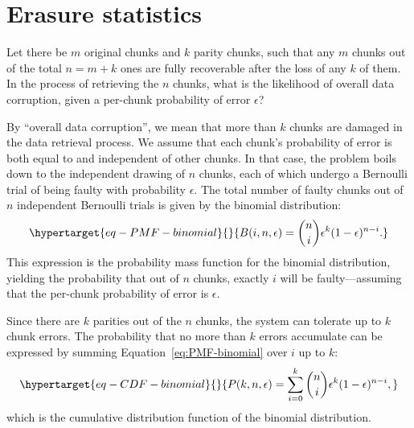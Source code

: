
% 
\chapter{Erasure statistics}
\label{sec:appendix-erasure}


Let there be \(m\) original chunks and \(k\) parity chunks, such that
any \(m\) chunks out of the total \(n = m + k\) ones are fully
recoverable after the loss of any \(k\) of them. In the process of
retrieving the \(n\) chunks, what is the likelihood of overall data
corruption, given a per-chunk probability of error \(\epsilon\)?

By ``overall data corruption'', we mean that more than \(k\) chunks are
damaged in the data retrieval process. We assume that each chunk's
probability of error is both equal to and independent of other chunks. In that case, the
problem boils down to the independent drawing of \(n\) chunks, each of
which undergo a Bernoulli trial of being faulty with probability
\(\epsilon\). The total number of faulty chunks out of \(n\) independent
Bernoulli trials is given by the binomial distribution:
\begin{equation}\protect\hypertarget{eq-PMF-binomial}{}{
B(i, n, \epsilon)
= \binom{n}{i} \epsilon^k (1-\epsilon)^{n-i} .
}\label{eq:PMF-binomial}\end{equation} This expression is the
probability mass function for the binomial distribution, yielding the
probability that out of \(n\) chunks, exactly \(i\) will be
faulty---assuming that the per-chunk probability of error is
\(\epsilon\).

Since there are \(k\) parities out of the \(n\) chunks, the system can
tolerate up to \(k\) chunk errors. The probability that no more than
\(k\) errors accumulate can be expressed by summing
Equation~\ref{eq:PMF-binomial} over \(i\) up to \(k\):
\begin{equation}\protect\hypertarget{eq-CDF-binomial}{}{
P(k, n, \epsilon)
= \sum_{i=0}^k \binom{n}{i} \epsilon^k (1-\epsilon)^{n-i} ,
}\label{eq:CDF-binomial}\end{equation} which is the cumulative
distribution function of the binomial distribution.

